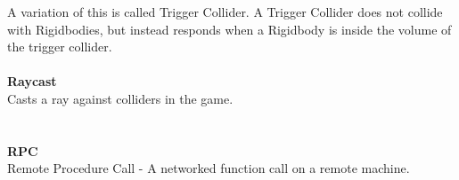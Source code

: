A variation of this is called Trigger Collider.
A Trigger Collider does not collide with Rigidbodies, but instead responds when a Rigidbody is inside the volume of the trigger collider.\cite{collider2dtrigger}\\
\\
\textbf{Raycast}\vspace{4pt}\\
Casts a ray against colliders in the game. \cite{raycast}\\
\\
\\
\textbf{RPC}\vspace{4pt}\\
Remote Procedure Call - A networked function call on a remote machine. \cite{rpc}\\
\\